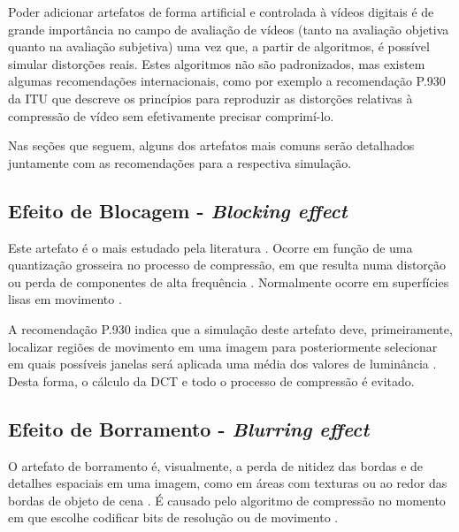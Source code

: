 Poder adicionar artefatos de forma artificial e controlada à vídeos digitais é de grande importância no campo de avaliação de vídeos (tanto na avaliação objetiva quanto na avaliação subjetiva) uma vez que, a partir de algoritmos, é possível simular distorções reais. Estes algoritmos não são padronizados, mas existem algumas recomendações internacionais, como por exemplo a recomendação P.930 da ITU \cite{itup930} que descreve os princípios para reproduzir as distorções relativas à compressão de vídeo sem efetivamente precisar comprimí-lo.

Nas seções que seguem, alguns dos artefatos mais comuns serão detalhados juntamente com as recomendações para a respectiva simulação.

\subsection{Efeito de Blocagem - \emph{Blocking effect}}

Este artefato é o mais estudado pela literatura \cite{emmersonsilva}. Ocorre em função de uma quantização grosseira no processo de compressão, em que resulta numa distorção ou perda de componentes de alta frequência \cite{itup930}. Normalmente ocorre em superfícies lisas em movimento \cite{itup930} \cite{farias2007}.


A recomendação P.930 indica que a simulação deste artefato deve, primeiramente, localizar regiões de movimento em uma imagem para posteriormente selecionar em quais possíveis janelas será aplicada uma média dos valores de luminância \cite{itup930}. Desta forma, o cálculo da DCT e todo o processo de compressão é evitado.

\subsection{Efeito de Borramento - \emph{Blurring effect}}

O artefato de borramento é, visualmente, a perda de nitidez das bordas e de detalhes espaciais em uma imagem, como em áreas com texturas ou ao redor das bordas de objeto de cena \cite{wurao2005}. É causado pelo algoritmo de compressão no momento em que escolhe codificar bits de resolução ou de movimento \cite{itup930}.

